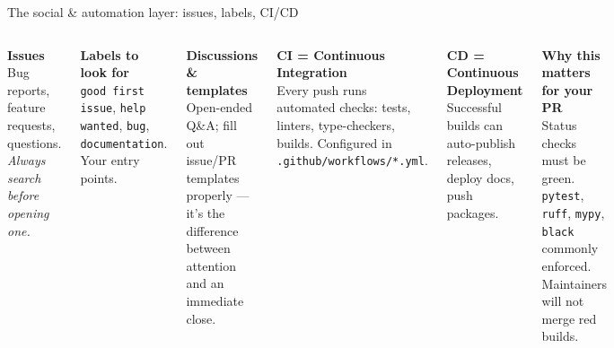 \documentclass[10pt,aspectratio=169]{beamer}
\begin{document}
\begin{frame}{The social \& automation layer: issues, labels, CI/CD}
  \begin{columns}[T]
    \textbf{\color{ghAccent}Issues}\\
    Bug reports, feature requests, questions. \emph{Always search before opening one.}

    \vspace{0.4em}
    \textbf{\color{ghAccent}Labels to look for}\\
    \texttt{good first issue}, \texttt{help wanted}, \texttt{bug},
    \texttt{documentation}. Your entry points.

    \vspace{0.4em}
    \textbf{\color{ghAccent}Discussions \& templates}\\
    Open-ended Q\&A; fill out issue/PR templates properly --- it's the
    difference between attention and an immediate close.

    \textbf{\color{ghAccent}CI = Continuous Integration}\\
    Every push runs automated checks: tests, linters, type-checkers,
    builds. Configured in \texttt{.github/workflows/*.yml}.

    \vspace{0.4em}
    \textbf{\color{ghAccent}CD = Continuous Deployment}\\
    Successful builds can auto-publish releases, deploy docs, push packages.

    \vspace{0.4em}
    \textbf{\color{ghAccent}Why this matters for your PR}\\
    Status checks must be green. \texttt{pytest}, \texttt{ruff},
    \texttt{mypy}, \texttt{black} commonly enforced. Maintainers will
    not merge red builds.
  \end{columns}
\end{frame}
\end{document}
